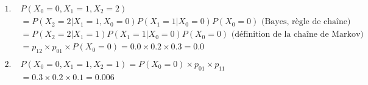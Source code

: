 \begin{Exercice}[15 minutes]
\begin{solution}
\begin{align*}
    1. \; &P(X_0=0,X_1=1, X_2=2) \\ 
    &= P(X_2=2|X_1=1,X_0=0)P(X_1=1|X_0=0)P(X_0 =0) \text{ (Bayes, règle de chaîne)}\\
    &= P(X_2=2|X_1=1)P(X_1=1|X_0=0)P(X_0=0) \text{ (définition de la chaîne de Markov)}\\ 
    &=p_{12} \times p_{01} \times P(X_0=0) = 0.0 \times 0.2 \times 0.3 = 0.0\\
    \\
    2. \; & P(X_0=0,X_1=1, X_2=1)=P(X_0 =0)\times p_{01} \times p_{11}\\
    &= 0.3 \times 0.2\times 0.1 = 0.006
\end{align*}
\end{solution}

\end{Exercice}

